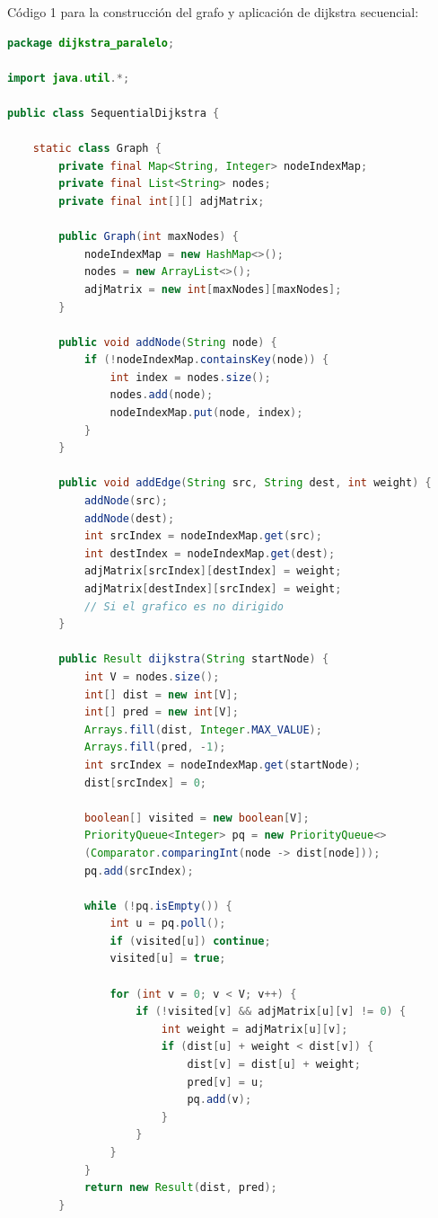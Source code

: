 Código 1 para la construcción del grafo y aplicación de dijkstra secuencial:
\begin{lstlisting}[language=Java, style=ColorStyle]
package dijkstra_paralelo;

import java.util.*;

public class SequentialDijkstra {

    static class Graph {
        private final Map<String, Integer> nodeIndexMap;
        private final List<String> nodes;
        private final int[][] adjMatrix;

        public Graph(int maxNodes) {
            nodeIndexMap = new HashMap<>();
            nodes = new ArrayList<>();
            adjMatrix = new int[maxNodes][maxNodes];
        }

        public void addNode(String node) {
            if (!nodeIndexMap.containsKey(node)) {
                int index = nodes.size();
                nodes.add(node);
                nodeIndexMap.put(node, index);
            }
        }

        public void addEdge(String src, String dest, int weight) {
            addNode(src);
            addNode(dest);
            int srcIndex = nodeIndexMap.get(src);
            int destIndex = nodeIndexMap.get(dest);
            adjMatrix[srcIndex][destIndex] = weight;
            adjMatrix[destIndex][srcIndex] = weight; 
            // Si el grafico es no dirigido
        }

        public Result dijkstra(String startNode) {
            int V = nodes.size();
            int[] dist = new int[V];
            int[] pred = new int[V];
            Arrays.fill(dist, Integer.MAX_VALUE);
            Arrays.fill(pred, -1);
            int srcIndex = nodeIndexMap.get(startNode);
            dist[srcIndex] = 0;

            boolean[] visited = new boolean[V];
            PriorityQueue<Integer> pq = new PriorityQueue<>
            (Comparator.comparingInt(node -> dist[node]));
            pq.add(srcIndex);

            while (!pq.isEmpty()) {
                int u = pq.poll();
                if (visited[u]) continue;
                visited[u] = true;

                for (int v = 0; v < V; v++) {
                    if (!visited[v] && adjMatrix[u][v] != 0) {
                        int weight = adjMatrix[u][v];
                        if (dist[u] + weight < dist[v]) {
                            dist[v] = dist[u] + weight;
                            pred[v] = u;
                            pq.add(v);
                        }
                    }
                }
            }
            return new Result(dist, pred);
        }


\end{lstlisting}
